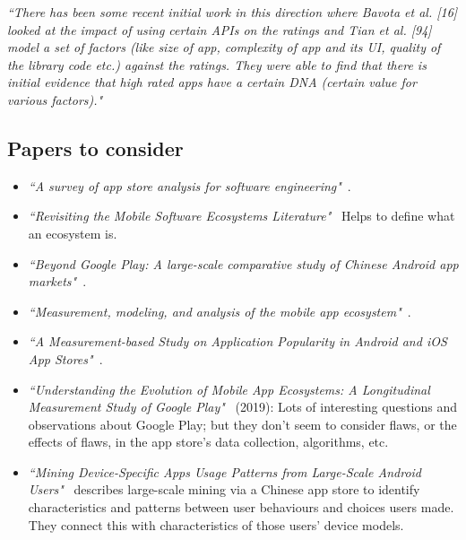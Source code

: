 \emph{``There has been some recent initial work in this direction where Bavota et al. [16] looked at the impact of using certain APIs on the ratings and Tian et al. [94] model a set of factors (like size of app, complexity of app and its UI, quality of the library code etc.) against the ratings. They were able to find that there is initial evidence that high rated apps have a certain DNA (certain value for various factors)."}~\citep[p. 29]{nagappan2016_future_trends_in_sw_eng_for_mobile_apps} 

\subsection{Papers to consider}
\begin{itemize}
    \item \emph{``A survey of app store analysis for software engineering"}~\cite{martin2016survey, martin2017_survey_in_app_store_analysis_for_software_engineering_IEEE_edition}.
    
    \item \emph{``Revisiting the Mobile Software Ecosystems Literature"}~\cite{steglich2019_revisiting_the_mobile_app_ecosystem} Helps to define what an ecosystem is.
    
    \item \emph{``Beyond Google Play: A large-scale comparative study of Chinese Android app markets"}~\cite{wang2018_beyond_google_play}.
    
    \item \emph{``Measurement, modeling, and analysis of the mobile app ecosystem"}~\cite{petsas2017measurement}.
    
    \item \emph{``A Measurement-based Study on Application Popularity in Android and iOS App Stores"}~\cite{liu2015measurement}.
    
    \item \emph{``Understanding the Evolution of Mobile App Ecosystems: A Longitudinal Measurement Study of Google Play"}~\cite{wang2019understanding} (2019): Lots of interesting questions and observations about Google Play; but they don't seem to consider flaws, or the effects of flaws, in the app store's data collection, algorithms, etc.
    
    \item \emph{``Mining Device-Specific Apps Usage Patterns from Large-Scale Android Users"}~\citep{li2017_mining_device_Specific_app_usage_patterns} describes large-scale mining via a Chinese app store to identify characteristics and patterns between user behaviours and choices users made. They connect this with characteristics of those users' device models.  


\end{itemize}
